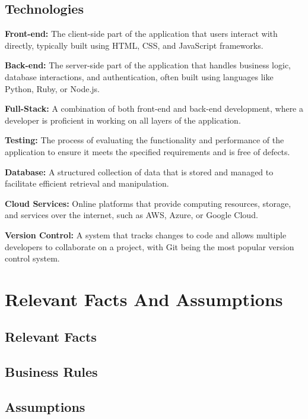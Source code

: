 \documentclass[12pt]{article}
\begin{document}
  \subsection{Technologies}
      \item \textbf{Front-end:} The client-side part of the application that users interact with directly, typically built using HTML, CSS, and JavaScript frameworks.
      \item \textbf{Back-end:} The server-side part of the application that handles business logic, database interactions, and authentication, often built using languages like Python, Ruby, or Node.js.
      \item \textbf{Full-Stack:} A combination of both front-end and back-end development, where a developer is proficient in working on all layers of the application.
      \item \textbf{Testing:} The process of evaluating the functionality and performance of the application to ensure it meets the specified requirements and is free of defects.
      \item \textbf{Database:} A structured collection of data that is stored and managed to facilitate efficient retrieval and manipulation.
      \item \textbf{Cloud Services:} Online platforms that provide computing resources, storage, and services over the internet, such as AWS, Azure, or Google Cloud.
      \item \textbf{Version Control:} A system that tracks changes to code and allows multiple developers to collaborate on a project, with Git being the most popular version control system.

\section{Relevant Facts And Assumptions}
  \subsection{Relevant Facts}
  \subsection{Business Rules}
  \subsection{Assumptions}
\end{document}
